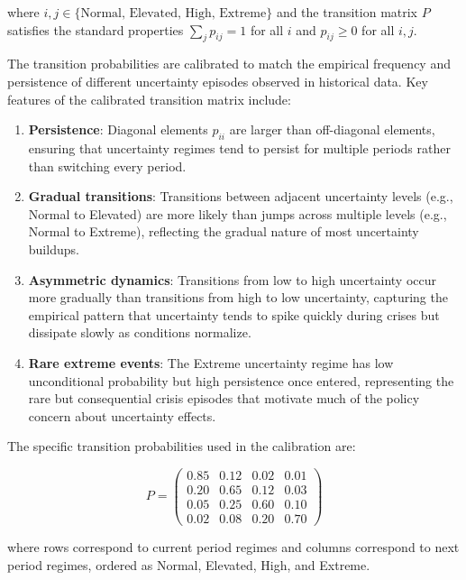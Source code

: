 \documentclass[5p,authoryear]{elsarticle}
\begin{document}
where $i,j \in \{\text{Normal, Elevated, High, Extreme}\}$ and the transition matrix $P$ satisfies the standard properties $\sum_j p_{ij} = 1$ for all $i$ and $p_{ij} \geq 0$ for all $i,j$.

The transition probabilities are calibrated to match the empirical frequency and persistence of different uncertainty episodes observed in historical data. Key features of the calibrated transition matrix include:

\begin{enumerate}
\item \textbf{Persistence}: Diagonal elements $p_{ii}$ are larger than off-diagonal elements, ensuring that uncertainty regimes tend to persist for multiple periods rather than switching every period.

\item \textbf{Gradual transitions}: Transitions between adjacent uncertainty levels (e.g., Normal to Elevated) are more likely than jumps across multiple levels (e.g., Normal to Extreme), reflecting the gradual nature of most uncertainty buildups.

\item \textbf{Asymmetric dynamics}: Transitions from low to high uncertainty occur more gradually than transitions from high to low uncertainty, capturing the empirical pattern that uncertainty tends to spike quickly during crises but dissipate slowly as conditions normalize.

\item \textbf{Rare extreme events}: The Extreme uncertainty regime has low unconditional probability but high persistence once entered, representing the rare but consequential crisis episodes that motivate much of the policy concern about uncertainty effects.
\end{enumerate}

The specific transition probabilities used in the calibration are:

\begin{equation}
P = \begin{pmatrix}
0.85 & 0.12 & 0.02 & 0.01 \\
0.20 & 0.65 & 0.12 & 0.03 \\
0.05 & 0.25 & 0.60 & 0.10 \\
0.02 & 0.08 & 0.20 & 0.70
\end{pmatrix}
\label{eq:transition_matrix}
\end{equation}

where rows correspond to current period regimes and columns correspond to next period regimes, ordered as Normal, Elevated, High, and Extreme.
\end{document}
